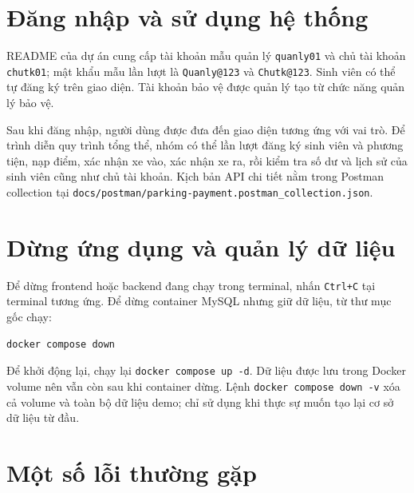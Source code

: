 \section{Đăng nhập và sử dụng hệ thống}

README của dự án cung cấp tài khoản mẫu quản lý \texttt{quanly01} và chủ tài khoản \texttt{chutk01}; mật khẩu mẫu lần lượt là \texttt{Quanly@123} và \texttt{Chutk@123}. Sinh viên có thể tự đăng ký trên giao diện. Tài khoản bảo vệ được quản lý tạo từ chức năng quản lý bảo vệ.

Sau khi đăng nhập, người dùng được đưa đến giao diện tương ứng với vai trò. Để trình diễn quy trình tổng thể, nhóm có thể lần lượt đăng ký sinh viên và phương tiện, nạp điểm, xác nhận xe vào, xác nhận xe ra, rồi kiểm tra số dư và lịch sử của sinh viên cũng như chủ tài khoản. Kịch bản API chi tiết nằm trong Postman collection tại \texttt{docs/postman/parking-payment.postman\_collection.json}.

\section{Dừng ứng dụng và quản lý dữ liệu}

Để dừng frontend hoặc backend đang chạy trong terminal, nhấn \texttt{Ctrl+C} tại terminal tương ứng. Để dừng container MySQL nhưng giữ dữ liệu, từ thư mục gốc chạy:
\begin{verbatim}
docker compose down
\end{verbatim}

Để khởi động lại, chạy lại \texttt{docker compose up -d}. Dữ liệu được lưu trong Docker volume nên vẫn còn sau khi container dừng. Lệnh \texttt{docker compose down -v} xóa cả volume và toàn bộ dữ liệu demo; chỉ sử dụng khi thực sự muốn tạo lại cơ sở dữ liệu từ đầu.

\section{Một số lỗi thường gặp}

